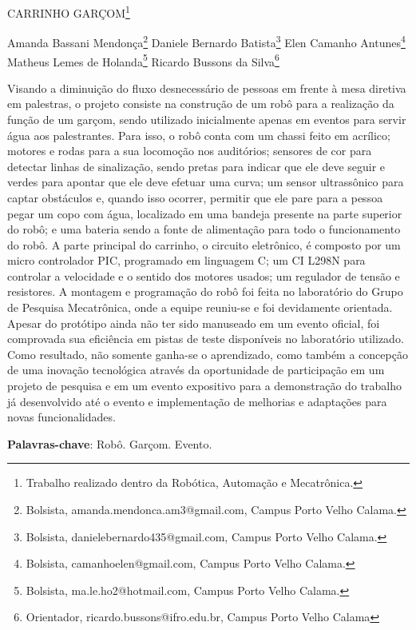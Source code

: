 \documentclass[article,12pt,onesidea,4paper,english,brazil]{abntex2}
\begin{document}
	
	
	\frenchspacing 
	
	\begin{center}
		\LARGE CARRINHO GARÇOM\footnote{Trabalho realizado dentro da Robótica, Automação e Mecatrônica.}
		
		\normalsize
		Amanda Bassani Mendonça\footnote{Bolsista, amanda.mendonca.am3@gmail.com, Campus Porto Velho Calama.} 
		Daniele Bernardo Batista\footnote{Bolsista, danielebernardo435@gmail.com, Campus Porto Velho Calama.} 
		Elen Camanho Antunes\footnote{Bolsista, camanhoelen@gmail.com, Campus Porto Velho Calama.} 
		Matheus Lemes de Holanda\footnote{Bolsista, ma.le.ho2@hotmail.com, Campus Porto Velho Calama.}
		Ricardo Bussons da Silva\footnote{Orientador, ricardo.bussons@ifro.edu.br, Campus Porto Velho Calama} 
	\end{center}
	
	\noindent Visando a diminuição do fluxo desnecessário de pessoas em frente à mesa diretiva
	em palestras, o projeto consiste na construção de um robô para a realização da
	função de um garçom, sendo utilizado inicialmente apenas em eventos para servir
	água aos palestrantes. Para isso, o robô conta com um chassi feito em acrílico;
	motores e rodas para a sua locomoção nos auditórios; sensores de cor para detectar
	linhas de sinalização, sendo pretas para indicar que ele deve seguir e verdes para
	apontar que ele deve efetuar uma curva; um sensor ultrassônico para captar
	obstáculos e, quando isso ocorrer, permitir que ele pare para a pessoa pegar um
	copo com água, localizado em uma bandeja presente na parte superior do robô; e
	uma bateria sendo a fonte de alimentação para todo o funcionamento do robô. A
	parte principal do carrinho, o circuito eletrônico, é composto por um micro
	controlador PIC, programado em linguagem C; um CI L298N para controlar a
	velocidade e o sentido dos motores usados; um regulador de tensão e resistores. A
	montagem e programação do robô foi feita no laboratório do Grupo de Pesquisa
	Mecatrônica, onde a equipe reuniu-se e foi devidamente orientada. Apesar do
	protótipo ainda não ter sido manuseado em um evento oficial, foi comprovada sua
	eficiência em pistas de teste disponíveis no laboratório utilizado. Como resultado,
	não somente ganha-se o aprendizado, como também a concepção de uma inovação
	tecnológica através da oportunidade de participação em um projeto de pesquisa e
	em um evento expositivo para a demonstração do trabalho já desenvolvido até o
	evento e implementação de melhorias e adaptações para novas funcionalidades.
	
	\vspace{\onelineskip}
	
	\noindent
	\textbf{Palavras-chave}: Robô. Garçom. Evento.
	
\end{document}
